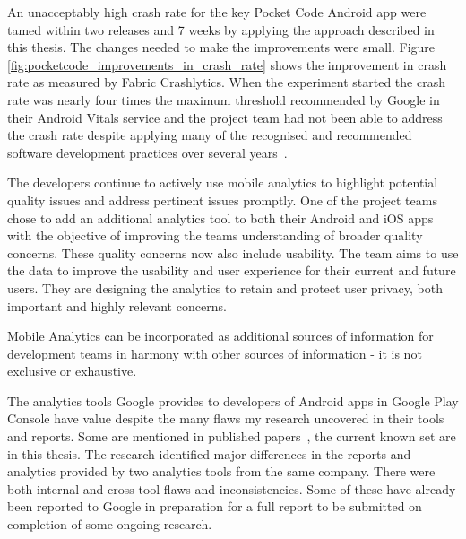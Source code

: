 An unacceptably high crash rate for the key Pocket Code Android app were tamed within two releases and 7 weeks by applying the approach described in this thesis. The changes needed to make the improvements were small. Figure \ref{fig:pocketcode_improvements_in_crash_rate} shows the improvement in crash rate as measured by Fabric Crashlytics. When the experiment started the crash rate was nearly four times the maximum threshold recommended by Google in their Android Vitals service and the project team had not been able to address the crash rate despite applying many of the recognised and recommended software development practices over several years~\cite{adamsen2015systematic_catrobat, luhana2018streamlining, ali2019behavior_catrobat, ali2019using_catrobat, hirsch2019approach_catrobat, schranz2019_contributors_impact_on_a_foss_project_quality_catrobat, slany2014tinkering}.

The developers continue to actively use mobile analytics to highlight potential quality issues and address pertinent issues promptly. One of the project teams chose to add an additional analytics tool to both their Android and iOS apps with the objective of improving the teams understanding of broader quality concerns. These quality concerns now also include usability. The team aims to use the data to improve the usability and user experience for their current and future users. They are designing the analytics to retain and protect user privacy, both important and highly relevant concerns.

Mobile Analytics can be incorporated as additional sources of information for development teams in harmony with other sources of information - it is not exclusive or exhaustive.

The analytics tools Google provides to developers of Android apps in Google Play Console have value despite the many flaws my research uncovered in their tools and reports. Some are mentioned in published papers~\cite{harty_google_play_console_insightful_development_using_android_vitals_and_pre_launch_reports, harty_better_android_apps_using_android_vitals, harty_improving_app_quality_despite_flawed_mobile_analytics}, the current known set are in this thesis. The research identified major differences in the reports and analytics provided by two analytics tools from the same company. There were both internal and cross-tool flaws and inconsistencies. Some of these have already been reported to Google in preparation for a full report to be submitted on completion of some ongoing research.

